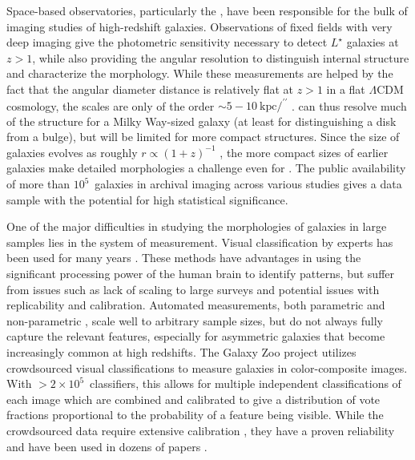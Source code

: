 \documentclass[twocolumn]{aastex6}
\begin{document}
Space-based observatories, particularly the \hubble, have been responsible for the bulk of imaging studies of high-redshift galaxies. Observations of fixed fields with very deep imaging \citep[eg,][]{wil96,gia04,bec06,dav07,sco07,gro11} give the photometric sensitivity necessary to detect $L^\star$ galaxies at $z>1$, while also providing the angular resolution to distinguish internal structure and characterize the morphology. While these measurements are helped by the fact that the angular diameter distance is relatively flat at $z>1$ in a flat $\Lambda$CDM cosmology, the scales are only of the order $\sim5-10~\mathrm{kpc}/^{\prime\prime}$ \citep{wri06}. \hst{} can thus resolve much of the structure for a Milky Way-sized galaxy (at least for distinguishing a disk from a bulge), but will be limited for more compact structures. Since the size of galaxies evolves as roughly $r\propto(1+z)^{-1}$ \citep{law12a}, the more compact sizes of earlier galaxies make detailed morphologies a challenge even for \hst{} \citep{che12}. The public availability of more than $10^5$~galaxies in archival imaging across various studies gives a data sample with the potential for high statistical significance. 

One of the major difficulties in studying the morphologies of galaxies in large samples lies in the system of measurement. Visual classification by experts has been used for many years \citep[eg,][]{hub26,dev59,san61,van76,nai10,bai11,kar15}. These methods have advantages in using the significant processing power of the human brain to identify patterns, but suffer from issues such as lack of scaling to large surveys and potential issues with replicability and calibration. Automated measurements, both parametric \citep{pen02a,sim11,lac12} and non-parametric \citep{abr03,con03,lot04,sca07,bam08,fre13}, scale well to arbitrary sample sizes, but do not always fully capture the relevant features, especially for asymmetric galaxies that become increasingly common at high redshifts. The Galaxy Zoo project \citep{lin08,lin11} utilizes crowdsourced visual classifications to measure galaxies in color-composite images. With $>2\times10^5$~classifiers, this allows for multiple independent classifications of each image which are combined and calibrated to give a distribution of vote fractions proportional to the probability of a feature being visible. While the crowdsourced data require extensive calibration \citep{bam09,wil13}, they have a proven reliability and have been used in dozens of papers \citep[eg,][]{lan08,bam09,dar10,mas11c,ski12,sim13,sch14,wil15}. 
\end{document}
